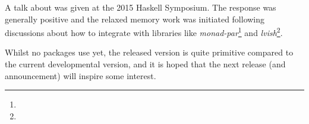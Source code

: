 A talk about \dejafu{} was given at the 2015 Haskell Symposium. The
response was generally positive and the relaxed memory work was
initiated following discussions about how to integrate \dejafu{} with
libraries like \emph{monad-par}\footnote{} and
\emph{lvish}\footnote{}.

Whilst no packages use \dejafu{} yet, the released version is quite
primitive compared to the current developmental version, and it is
hoped that the next release (and announcement) will inspire some
interest.
